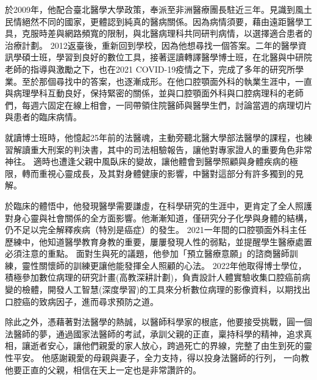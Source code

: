 \documentclass{letter}
\begin{document}
\begin{letter}
於2009年，他配合臺北醫學大學政策，奉派至非洲醫療團長駐近三年。見識到風土民情絕然不同的國家，更體認到純真的醫病關係。因為病情須要，藉由遠距醫學工具，克服時差與網路頻寬的限制，與北醫病理科共同研判病情，以選擇適合患者的治療計劃。
2012返臺後，重新回到學校，因為他想尋找一個答案。二年的醫學資訊學碩士班，學習到良好的數位工具，接著逕讀轉譯醫學博士班，在北醫與中研院老師的指導與激勵之下，也在2021 COVID-19疫情之下，完成了多年的研究所學業。至於那個尋找中的答案，也逐漸成形。在他口腔顎面外科的執業生涯中，一直與病理學科互動良好，保持緊密的關係，並與口腔顎面外科與口腔病理科的老師們，每週六固定在線上相會，一同帶領住院醫師與醫學生們，討論當週的病理切片與患者的臨床病情。


就讀博士班時，他憶起25年前的法醫魂，主動旁聽北醫大學部法醫學的課程，也練習解讀重大刑案的判決書，其中的司法相驗報告，讓他對專家證人的重要角色非常神往。
適時也遭逢父親中風臥床的變故，讓他體會到醫學照顧與身體疾病的極限，轉而重視心靈成長，及其對身體健康的影響，中醫對這部分有許多獨到的見解。

於臨床的體悟中，他發現醫學需要謙虛，在科學研究的生涯中，更肯定了全人照護對身心靈與社會關係的全方面影響。他漸漸知道，僅研究分子化學與身體的結構，仍不足以完全解釋疾病（特別是癌症）的發生。
2021一年間的口腔顎面外科主任歷練中，他知道醫學教育身教的重要，屢屢發現人性的弱點，並提醒學生醫療處置必須注意的重點。 %
面對生與死的議題，他參加「預立醫療意願」的諮商醫師訓練，靈性關懷師的訓練更讓他能發揮全人照顧的心法。
2022年他取得博士學位，積極參加數位病理的研究計畫(高教深耕計劃)，負責設計人體實驗收集口腔癌前病變的檢體，開發人工智慧(深度學習)的工具來分析數位病理的影像資料，以期找出口腔癌的致病因子，進而尋求預防之道。

除此之外，憑藉著對法醫學的熱誠，以醫師科學家的根底，他要接受挑戰，圓一個法醫師的夢，通過國家法醫師的考試，承訓父親的正直，稟持科學的精神，追求真相，讓逝者安心，讓他們親愛的家人放心，跨過死亡的界線，完整了由生到死的靈性平安。
他感謝親愛的母親與妻子，全力支持，得以投身法醫師的行列，%
一向教他要正直的父親，相信在天上一定也是非常讚許的。


\end{letter}
\end{document}

